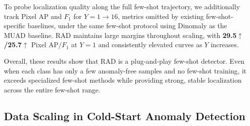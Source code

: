 \documentclass{article}
\theoremstyle{plain}
\theoremstyle{definition}
\theoremstyle{remark}
\begin{document}
To probe localization quality along the full few-shot trajectory, we additionally track Pixel AP and $F_1$ for $Y{=}1\rightarrow16$, metrics omitted by existing few-shot-specific baselines, under the same few-shot protocol using Dinomaly as the MUAD baseline. RAD maintains large margins throughout scaling, with \textbf{29.5$\uparrow$/25.7$\uparrow$} Pixel AP/$F_1$ at $Y{=}1$ and consistently elevated curves as $Y$ increases.


Overall, these results show that RAD is a plug-and-play few-shot detector. Even when each class has only a few anomaly-free samples and no few-shot training, it exceeds specialized few-shot methods while providing strong, stable localization across the entire few-shot range.


\subsection{Data Scaling in Cold-Start Anomaly Detection}
\label{sec:data_sacling}



\end{document}
